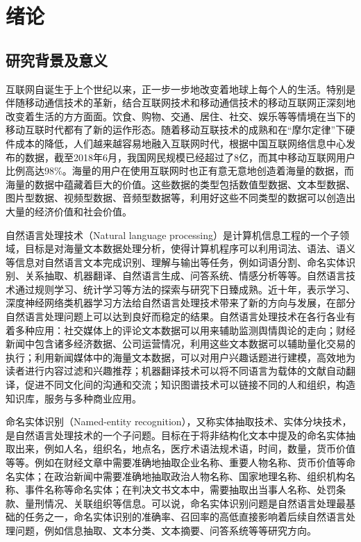 \documentclass[winfonts,master,oneside,nobackinfo]{njuthesis}
\begin{document}
\chapter{绪论}\label{chapter_introduction}
\section{研究背景及意义}
互联网自诞生于上个世纪以来，正一步一步地改变着地球上每个人的生活。特别是伴随移动通信技术的革新，结合互联网技术和移动通信技术的移动互联网正深刻地改变着生活的方方面面。饮食、购物、交通、居住、社交、娱乐等等情境在当下的移动互联时代都有了新的运作形态。随着移动互联技术的成熟和在“摩尔定律”下硬件成本的降低，人们越来越容易地融入互联网时代，根据中国互联网络信息中心发布的数据，截至2018年6月，我国网民规模已经超过了8亿，而其中移动互联网用户比例高达98\%。海量的用户在使用互联网时也正有意无意地创造着海量的数据，而海量的数据中蕴藏着巨大的价值。这些数据的类型包括数值型数据、文本型数据、图片型数据、视频型数据、音频型数据等，利用好这些不同类型的数据可以创造出大量的经济价值和社会价值。

自然语言处理技术（Natural language processing）是计算机信息工程的一个子领域，目标是对海量文本数据处理分析，使得计算机程序可以利用词法、语法、语义等信息对自然语言文本完成识别、理解与输出等任务，例如词语分割、命名实体识别、关系抽取、机器翻译、自然语言生成、问答系统、情感分析等等。自然语言技术通过规则学习、统计学习等方法的探索与研究下日臻成熟。近十年，表示学习、深度神经网络类机器学习方法给自然语言处理技术带来了新的方向与发展，在部分自然语言处理问题上可以达到良好而稳定的结果。自然语言处理技术在各行各业有着多种应用：社交媒体上的评论文本数据可以用来辅助监测舆情舆论的走向；财经新闻中包含诸多经济数据、公司运营情况，利用这些文本数据可以辅助量化交易的执行；利用新闻媒体中的海量文本数据，可以对用户兴趣话题进行建模，高效地为读者进行内容过滤和兴趣推荐；机器翻译技术可以将不同语言为载体的文献自动翻译，促进不同文化间的沟通和交流；知识图谱技术可以链接不同的人和组织，构造知识库，服务与多种商业应用。

命名实体识别（Named-entity recognition），又称实体抽取技术、实体分块技术，是自然语言处理技术的一个子问题。目标在于将非结构化文本中提及的命名实体抽取出来，例如人名，组织名，地点名，医疗术语法规术语，时间，数量，货币价值等等。例如在财经文章中需要准确地抽取企业名称、重要人物名称、货币价值等命名实体；在政治新闻中需要准确地抽取政治人物名称、国家地理名称、组织机构名称、事件名称等命名实体；在判决文书文本中，需要抽取出当事人名称、处罚条款、量刑情况、关联组织等信息。可以说，命名实体识别问题是自然语言处理最基础的任务之一，命名实体识别的准确率、召回率的高低直接影响着后续自然语言处理问题，例如信息抽取、文本分类、文本摘要、问答系统等等研究方向。
\end{document}
